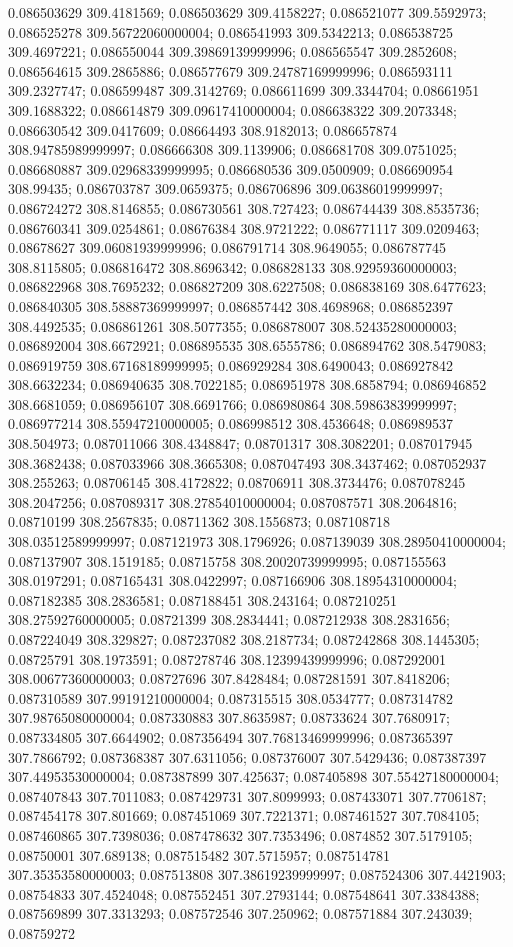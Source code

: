0.086503629 309.4181569; 0.086503629 309.4158227; 0.086521077 309.5592973; 0.086525278 309.56722060000004; 0.086541993 309.5342213; 0.086538725 309.4697221; 0.086550044 309.39869139999996; 0.086565547 309.2852608; 0.086564615 309.2865886; 0.086577679 309.24787169999996; 0.086593111 309.2327747; 0.086599487 309.3142769; 0.086611699 309.3344704; 0.08661951 309.1688322; 0.086614879 309.09617410000004; 0.086638322 309.2073348; 0.086630542 309.0417609; 0.08664493 308.9182013; 0.086657874 308.94785989999997; 0.086666308 309.1139906; 0.086681708 309.0751025; 0.086680887 309.02968339999995; 0.086680536 309.0500909; 0.086690954 308.99435; 0.086703787 309.0659375; 0.086706896 309.06386019999997; 0.086724272 308.8146855; 0.086730561 308.727423; 0.086744439 308.8535736; 0.086760341 309.0254861; 0.08676384 308.9721222; 0.086771117 309.0209463; 0.08678627 309.06081939999996; 0.086791714 308.9649055; 0.086787745 308.8115805; 0.086816472 308.8696342; 0.086828133 308.92959360000003; 0.086822968 308.7695232; 0.086827209 308.6227508; 0.086838169 308.6477623; 0.086840305 308.58887369999997; 0.086857442 308.4698968; 0.086852397 308.4492535; 0.086861261 308.5077355; 0.086878007 308.52435280000003; 0.086892004 308.6672921; 0.086895535 308.6555786; 0.086894762 308.5479083; 0.086919759 308.67168189999995; 0.086929284 308.6490043; 0.086927842 308.6632234; 0.086940635 308.7022185; 0.086951978 308.6858794; 0.086946852 308.6681059; 0.086956107 308.6691766; 0.086980864 308.59863839999997; 0.086977214 308.55947210000005; 0.086998512 308.4536648; 0.086989537 308.504973; 0.087011066 308.4348847; 0.08701317 308.3082201; 0.087017945 308.3682438; 0.087033966 308.3665308; 0.087047493 308.3437462; 0.087052937 308.255263; 0.08706145 308.4172822; 0.08706911 308.3734476; 0.087078245 308.2047256; 0.087089317 308.27854010000004; 0.087087571 308.2064816; 0.08710199 308.2567835; 0.08711362 308.1556873; 0.087108718 308.03512589999997; 0.087121973 308.1796926; 0.087139039 308.28950410000004; 0.087137907 308.1519185; 0.08715758 308.20020739999995; 0.087155563 308.0197291; 0.087165431 308.0422997; 0.087166906 308.18954310000004; 0.087182385 308.2836581; 0.087188451 308.243164; 0.087210251 308.27592760000005; 0.08721399 308.2834441; 0.087212938 308.2831656; 0.087224049 308.329827; 0.087237082 308.2187734; 0.087242868 308.1445305; 0.08725791 308.1973591; 0.087278746 308.12399439999996; 0.087292001 308.00677360000003; 0.08727696 307.8428484; 0.087281591 307.8418206; 0.087310589 307.99191210000004; 0.087315515 308.0534777; 0.087314782 307.98765080000004; 0.087330883 307.8635987; 0.08733624 307.7680917; 0.087334805 307.6644902; 0.087356494 307.76813469999996; 0.087365397 307.7866792; 0.087368387 307.6311056; 0.087376007 307.5429436; 0.087387397 307.44953530000004; 0.087387899 307.425637; 0.087405898 307.55427180000004; 0.087407843 307.7011083; 0.087429731 307.8099993; 0.087433071 307.7706187; 0.087454178 307.801669; 0.087451069 307.7221371; 0.087461527 307.7084105; 0.087460865 307.7398036; 0.087478632 307.7353496; 0.0874852 307.5179105; 0.08750001 307.689138; 0.087515482 307.5715957; 0.087514781 307.35353580000003; 0.087513808 307.38619239999997; 0.087524306 307.4421903; 0.08754833 307.4524048; 0.087552451 307.2793144; 0.087548641 307.3384388; 0.087569899 307.3313293; 0.087572546 307.250962; 0.087571884 307.243039; 0.08759272 